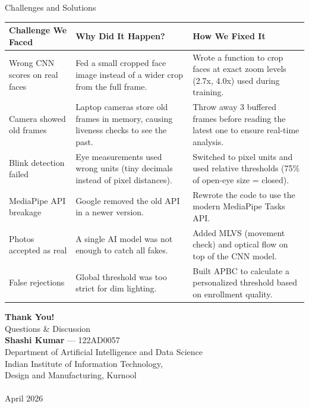 \documentclass[aspectratio=169,11pt]{beamer}
\begin{document}
\begin{frame}{Challenges and Solutions}
\renewcommand{\arraystretch}{1.25}\scriptsize
\begin{tabular}{@{}p{3cm}p{4.5cm}p{6cm}@{}}
\toprule
\textbf{Challenge We Faced} & \textbf{Why Did It Happen?} & \textbf{How We Fixed It}\\
\midrule
Wrong CNN scores on real faces & Fed a small cropped face image instead of a wider crop from the full frame. & Wrote a function to crop faces at exact zoom levels (2.7x, 4.0x) used during training.\\[2pt]
Camera showed old frames & Laptop cameras store old frames in memory, causing liveness checks to see the past. & Throw away 3 buffered frames before reading the latest one to ensure real-time analysis.\\[2pt]
Blink detection failed & Eye measurements used wrong units (tiny decimals instead of pixel distances). & Switched to pixel units and used relative thresholds (75\% of open-eye size = closed).\\[2pt]
MediaPipe API breakage & Google removed the old API in a newer version. & Rewrote the code to use the modern MediaPipe Tasks API.\\[2pt]
Photos accepted as real & A single AI model was not enough to catch all fakes. & Added MLVS (movement check) and optical flow on top of the CNN model.\\[2pt]
False rejections & Global threshold was too strict for dim lighting. & Built APBC to calculate a personalized threshold based on enrollment quality.\\
\bottomrule
\end{tabular}
\end{frame}

\begin{frame}[plain]
\vspace*{1.8cm}
\begin{center}
{\Huge \textbf{Thank You!}}\\[12pt]
{\large Questions \& Discussion}\\[18pt]
\textbf{Shashi Kumar} --- 122AD0057\\[4pt]
Department of Artificial Intelligence and Data Science\\
Indian Institute of Information Technology,\\Design and Manufacturing, Kurnool\\[10pt]
\vspace{8pt}\\
{\small April 2026}
\end{center}
\end{frame}
\end{document}
